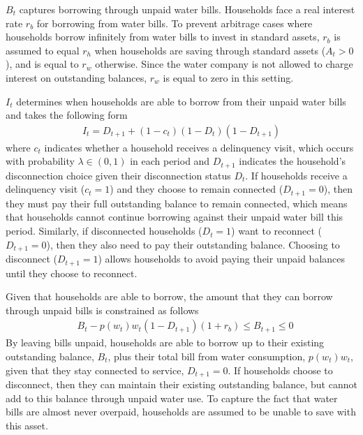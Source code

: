 \documentclass[12pt]{article}
\begin{document}
$B_t$ captures borrowing through unpaid water bills.  Households face a real interest rate $r_b$ for borrowing from water bills.  To prevent arbitrage cases where households borrow infinitely from water bills to invest in standard assets, $r_b$ is assumed to equal $r_h$ when households are saving through standard assets ($A_t>0$), and is equal to $r_w$ otherwise.  Since the water company is not allowed to charge interest on outstanding balances, $r_w$ is equal to zero in this setting.%

$I_t$ determines when households are able to borrow from their unpaid water bills and takes the following form
\begin{align}
I_t = D_{t+1} + (1-c_t) (1-D_t) (1-D_{t+1})
\end{align} %
where $c_t$ indicates whether a household receives a delinquency visit, which occurs with probability $\lambda \in (0,1)$ in each period and $D_{t+1}$ indicates the household's disconnection choice given their disconnection status $D_t$.  If households receive a delinquency visit ($c_t=1$) and they choose to remain connected ($D_{t+1}=0$), then they must pay their full outstanding balance to remain connected, which means that households cannot continue borrowing against their unpaid water bill this period.  Similarly, if disconnected households ($D_t=1$) want to reconnect  ($D_{t+1}=0$), then they also need to pay their outstanding balance.  Choosing to disconnect ($D_{t+1}=1$) allows households to avoid paying their unpaid balances until they choose to reconnect.  

Given that households are able to borrow, the amount that they can borrow through unpaid bills is constrained as follows
\begin{align}\label{eq:borrowconstraint}
&B_t -  p(w_t) w_t (1-D_{t+1})(1+r_b) \leq B_{t+1} \leq 0 
\end{align}
By leaving bills unpaid, households are able to borrow up to their existing outstanding balance, $B_t$, plus their total bill from water consumption, $p(w_t) w_t$, given that they stay connected to service, $D_{t+1}=0$.  If households choose to disconnect, then they can maintain their existing outstanding balance, but cannot add to this balance through unpaid water use.  To capture the fact that water bills are almost never overpaid, households are assumed to be unable to save with this asset.
\end{document}
